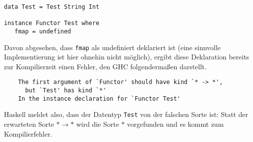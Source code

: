 \begin{verbatim}
data Test = Test String Int

instance Functor Test where
   fmap = undefined
\end{verbatim}

Davon abgesehen, dass \texttt{fmap} als undefiniert deklariert ist (eine sinnvolle Implementierung ist hier ohnehin nicht möglich), ergibt diese Deklaration bereits zur Kompilierzeit einen Fehler, den GHC folgendermaßen darstellt.

\begin{verbatim}
    The first argument of `Functor' should have kind `* -> *',
      but `Test' has kind `*'
    In the instance declaration for `Functor Test'
\end{verbatim}

Haskell meldet also, dass der Datentyp \texttt{Test} von der falschen Sorte ist: Statt der erwarteten Sorte $* \rightarrow *$
wird die Sorte $*$ vorgefunden und es kommt zum Kompilierfehler.


